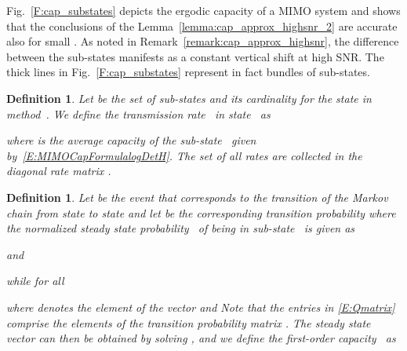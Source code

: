 \documentclass[10pt,conference]{IEEEtran}
\newtheorem{defn}[theorem]{Definition}
\begin{document}
Fig.~\ref{F:cap_substates} depicts the ergodic capacity of a  MIMO system and shows that the conclusions of the Lemma~\ref{lemma:cap_approx_highsnr_2} are accurate also for small . As noted in Remark~\ref{remark:cap_approx_highsnr}, the difference between the sub-states manifests as a constant vertical shift at high SNR.
The thick lines in Fig.~\ref{F:cap_substates} represent in fact bundles of sub-states.


\begin{defn}

Let  be the set of sub-states and  its cardinality for the state  in \emph{method~}.  We define the \emph{transmission rate}~ in state~ as

where  is the average capacity of the sub-state~ given by~\eqref{E:MIMOCapFormulalogDetH}.
The set of all rates  are collected in the diagonal \emph{rate matrix} .
\end{defn}


\begin{defn}

Let  be the event that corresponds to the transition of the Markov chain from state  to state  and let  be the corresponding transition probability 
where the normalized steady state probability~ of being in sub-state~ is given as

and

while for all 

where  denotes the element of the vector
and
 Note that the entries  in \eqref{E:Qmatrix} comprise the elements of the transition probability matrix .
The steady state vector  can then be obtained by solving , and we define the first-order capacity~ as



\end{defn}
\end{document}
